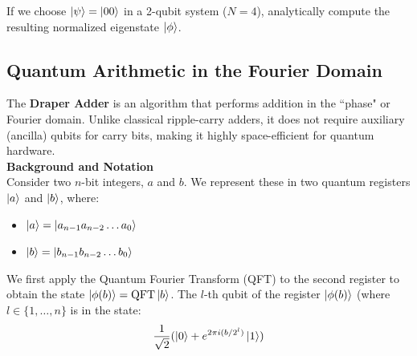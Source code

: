If we choose $\ket{\psi} = \ket{00}$ in a 2-qubit system ($N=4$), analytically compute the resulting normalized eigenstate $\ket{\phi}$. \\
\noindent{} 



\newpage
\subsection{Quantum Arithmetic in the Fourier Domain}
The \textbf{Draper Adder} is an algorithm that performs addition in the ``phase" or Fourier domain. Unlike classical ripple-carry adders, it does not require auxiliary (ancilla) qubits for carry bits, making it highly space-efficient for quantum hardware. \\ 

\textbf{Background and Notation}\\
Consider two $n$-bit integers, $a$ and $b$. We represent these in two quantum registers $\ket{a}$ and $\ket{b}$, where:
\begin{itemize}
    \item $\ket{a} = \ket{a_{n-1}a_{n-2}\ldots a_0}$
    \item $\ket{b} = \ket{b_{n-1}b_{n-2}\ldots b_0}$
\end{itemize}
We first apply the Quantum Fourier Transform (QFT) to the second register to obtain the state $\ket{\phi(b)} = \mathrm{QFT}\ket{b}$. The $l$-th qubit of the register $\ket{\phi(b)}$ (where $l \in \{1,\ldots, n\}$ is in the state:
\begin{equation}
    \frac{1}{\sqrt{2}} (\ket{0} + e^{2 \pi i (b/2^l)}\ket{1})
\end{equation}
 
